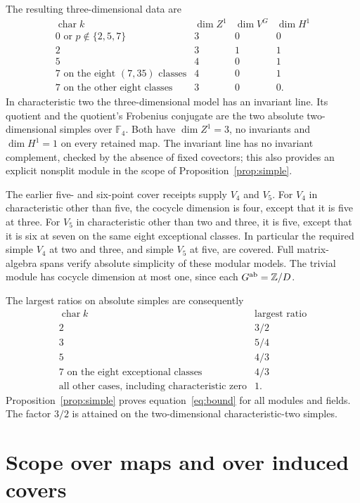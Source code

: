 \documentclass[11pt]{article}
\newcommand{\Z}{\mathbb Z}
\newcommand{\F}{\mathbb F}
\begin{document}
The resulting three-dimensional data are
\[
\begin{array}{c|c|c|c}
 \operatorname{char}k&\dim Z^1&\dim V^G&\dim H^1\\\hline
 0\text{ or }p\notin\{2,5,7\}&3&0&0\\
 2&3&1&1\\
 5&4&0&1\\
 7\text{ on the eight }(7,35)\text{ classes}&4&0&1\\
 7\text{ on the other eight classes}&3&0&0.
\end{array}
\]
In characteristic two the three-dimensional model has an invariant
line. Its quotient and the quotient's Frobenius conjugate are the
two absolute two-dimensional simples over $\F_4$. Both have
$\dim Z^1=3$, no invariants and $\dim H^1=1$ on every retained map.
The invariant line has no invariant complement, checked by the
absence of fixed covectors; this also provides an explicit nonsplit
module in the scope of Proposition~\ref{prop:simple}.

The earlier five- and six-point cover receipts supply $V_4$ and
$V_5$. For $V_4$ in characteristic other than five, the cocycle
dimension is four, except that it is five at three. For $V_5$ in
characteristic other than two and three, it is five, except that it
is six at seven on the same eight exceptional classes. In particular
the required simple $V_4$ at two and three, and simple $V_5$ at five,
are covered. Full matrix-algebra spans verify absolute simplicity
of these modular models. The trivial module has cocycle dimension
at most one, since each $G^{\rm ab}=\Z/D$.

The largest ratios on absolute simples are consequently
\[
\begin{array}{c|c}
 \operatorname{char}k&\text{largest ratio}\\\hline
 2&3/2\\
 3&5/4\\
 5&4/3\\
 7\text{ on the eight exceptional classes}&4/3\\
 \text{all other cases, including characteristic zero}&1.
\end{array}
\]
Proposition~\ref{prop:simple} proves equation~\eqref{eq:bound} for
all modules and fields. The factor $3/2$ is attained on the
two-dimensional characteristic-two simples.

\section{Scope over maps and over induced covers}
\end{document}

